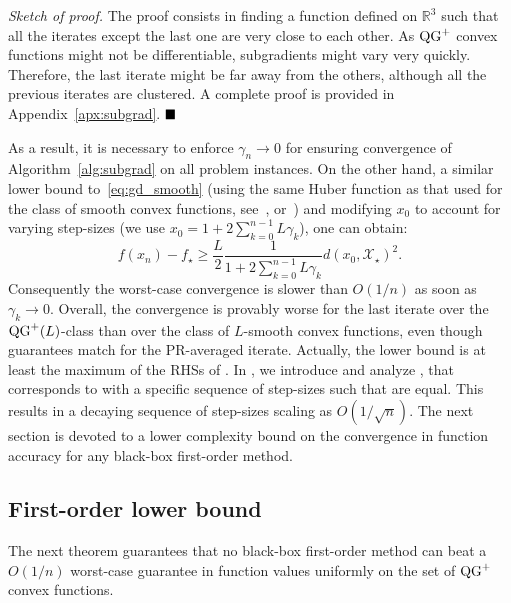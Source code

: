         \noindent \textit{Sketch of proof.}
        The proof consists in finding a function defined on $\mathbb{R}^3$ such that all the iterates except the last one are very close to each other.
        As $\operatorname{QG}^+$ convex functions might not be differentiable, subgradients might vary very quickly.
        Therefore, the last iterate might be far away from the others, although all the previous iterates are clustered.
        A complete proof is provided in Appendix~\ref{apx:subgrad}.
        $\hfill\blacksquare$

        As a result, it is necessary to enforce $\gamma_n \rightarrow 0$ for ensuring convergence of Algorithm~\ref{alg:subgrad} on all problem instances.
        On the other hand, a similar lower bound to~\eqref{eq:gd_smooth} (using the same Huber function as that used for the class of smooth convex functions, see~\citep{drori2014performance}, or~\citep[Section 4]{taylor2017smooth}) and modifying $x_0$ to account for varying step-sizes (we use $x_0 = 1 + 2 \sum_{k=0}^{n-1} L\gamma_k$), one can obtain:
        \begin{equation}
            f(x_n) - f_\star \geq \frac{L}{2}\frac{1}{1 + 2 \sum_{k=0}^{n-1} L\gamma_k} d(x_0, \mathcal{X}_\star)^2.
            \label{eq:LB_smooth}
        \end{equation}
        Consequently the worst-case convergence is slower than $O(1 / n)$ as soon as $\gamma_k\rightarrow 0$.
        Overall, the convergence is provably worse for the last iterate over the $\operatorname{QG}^+(L)$-class than over the class of $L$-smooth convex functions, even though guarantees match for the PR-averaged iterate.
        Actually, the lower bound is at least the maximum of the RHSs of .
        In , we introduce and analyze , that corresponds to  with a specific sequence of step-sizes such that  are equal.
        This results in a decaying sequence of step-sizes scaling as $O(1/\sqrt{n})$.
        The next section is devoted to a lower complexity bound on the convergence in function accuracy for any black-box first-order method.

    \subsection{First-order lower bound}\label{subsec:first_order_lower_bound}

        The next theorem guarantees that no black-box first-order method can beat a $O(1 / n)$ worst-case guarantee in function values uniformly on the set of $\operatorname{QG}^+$ convex functions.

